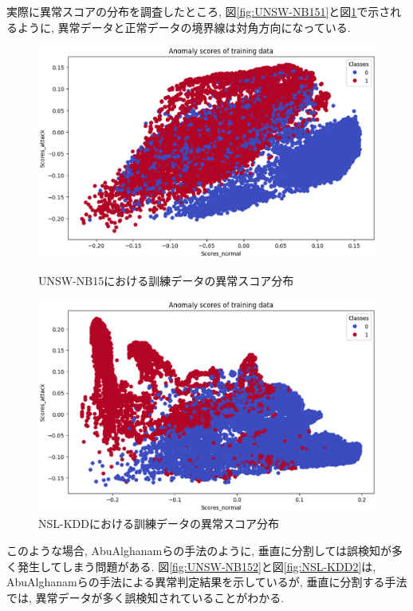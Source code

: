 \documentclass{css}
\begin{document}
実際に異常スコアの分布を調査したところ, 図\ref{fig:UNSW-NB151}と図\ref{fig:NSL-KDD1}で示されるように, 異常データと正常データの境界線は対角方向になっている. 

\begin{figure}[ht]
    \centering
    \begin{minipage}{0.9\linewidth}
        \centering
        \includegraphics[width=\linewidth]{pictures/eps/UNSW-NB151.eps}
        \caption{UNSW-NB15における訓練データの異常スコア分布}
        \label{fig:UNSW-NB151}
    \end{minipage}
    \vfill{}
    \begin{minipage}{0.9\linewidth}
        \centering
        \includegraphics[width=\linewidth]{pictures/eps/NSL-KDD1.eps}
        \caption{NSL-KDDにおける訓練データの異常スコア分布}
        \label{fig:NSL-KDD1}
    \end{minipage}
\end{figure}

このような場合, AbuAlghanamらの手法\cite{AbuAlghanam2023-sx}のように, 垂直に分割しては誤検知が多く発生してしまう問題がある. 図\ref{fig:UNSW-NB152}と図\ref{fig:NSL-KDD2}は, AbuAlghanamらの手法による異常判定結果を示しているが, 垂直に分割する手法では, 異常データが多く誤検知されていることがわかる. 
\end{document}
